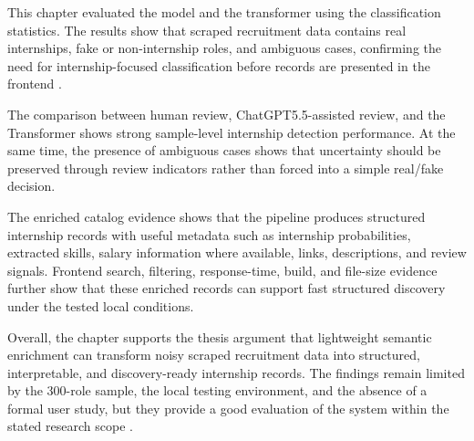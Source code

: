This chapter evaluated the model and the transformer using the classification statistics. The results show that scraped recruitment data contains real internships, fake or non-internship roles, and ambiguous cases, confirming the need for internship-focused classification before records are presented in the frontend \cite{sokolova2009systematic}.

The comparison between human review, ChatGPT5.5-assisted review, and the Transformer shows strong sample-level internship detection performance. At the same time, the presence of ambiguous cases shows that uncertainty should be preserved through review indicators rather than forced into a simple real/fake decision.

The enriched catalog evidence shows that the pipeline produces structured internship records with useful metadata such as internship probabilities, extracted skills, salary information where available, links, descriptions, and review signals. Frontend search, filtering, response-time, build, and file-size evidence further show that these enriched records can support fast structured discovery under the tested local conditions.

Overall, the chapter supports the thesis argument that lightweight semantic enrichment can transform noisy scraped recruitment data into structured, interpretable, and discovery-ready internship records. The findings remain limited by the 300-role sample, the local testing environment, and the absence of a formal user study, but they provide a good evaluation of the system within the stated research scope \cite{schwartz2020green, menghani2023efficient, wohlin2012experimentation}.

